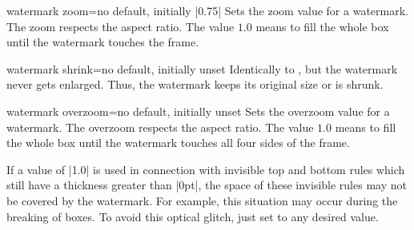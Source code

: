 \enlargethispage{5mm}
\begin{docTcbKey}{watermark zoom}{=}{no default, initially |0.75|}
  Sets the zoom value for a watermark. The zoom respects the aspect ratio.
  The value $1.0$ means to fill the whole box until the watermark touches the frame.
\begin{dispExample}

\begin{tcolorbox}[title=Zoom 1.0,watermark zoom=1.0]
\lipsum[2]
\end{tcolorbox}\hfill%
\begin{tcolorbox}[title=Zoom 0.5,watermark zoom=0.5]
\lipsum[2]
\end{tcolorbox}%
\end{dispExample}
\end{docTcbKey}

\clearpage

\begin{docTcbKey}{watermark shrink}{=}{no default, initially unset}
  Identically to , but the watermark
  never gets enlarged. Thus, the watermark keeps its original size or is shrunk.
\end{docTcbKey}


\begin{docTcbKey}{watermark overzoom}{=}{no default, initially unset}
  Sets the overzoom value for a watermark. The overzoom respects the aspect ratio.
  The value $1.0$ means to fill the whole box until the watermark touches
  all four sides of the frame.
\begin{dispExample}

\begin{tcolorbox}[title=Zoom 1.0,watermark zoom=1.0]
\lipsum[1]
\end{tcolorbox}\hfill%
\begin{tcolorbox}[title=Overzoom 1.0,watermark overzoom=1.0]
\lipsum[1]
\end{tcolorbox}%
\end{dispExample}
\end{docTcbKey}

\begin{marker}
If a  value of |1.0| is used in connection
with invisible top and bottom rules which still have a thickness greater than |0pt|,
the space of these invisible rules may not be covered by the watermark.
For example, this situation may occur during the breaking of  boxes.
To avoid this optical glitch, just set  to any desired value.
\end{marker}

